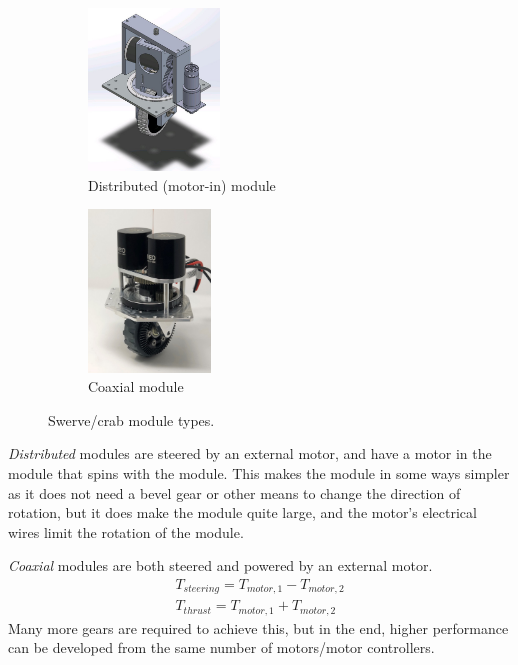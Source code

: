 \begin{figure}[H]

\begin{subfigure}[b]{.32\linewidth}
	\includegraphics[height=1.7in]{imgs/drivetrain_swerve_dist.jpeg}
	\caption{Distributed (motor-in) module}
\end{subfigure}\begin{subfigure}[b]{.32\linewidth}
	\includegraphics[height=1.7in]{imgs/drivetrain_swerve_coax.jpeg}
	\caption{Coaxial module}
\end{subfigure}
\caption{Swerve/crab module types.}
\end{figure}

\begin{asparaenum}[a)]
	\item \textit{Distributed} modules are steered by an external motor, and have a motor in the module that spins with the module. This makes the module in some ways simpler as it does not need a bevel gear or other means to change the direction of rotation, but it does make the module quite large, and the motor's electrical wires limit the rotation of the module.
	\item \textit{Coaxial} modules are both steered and powered by an external motor.
	\begin{align}
		T_{steering} = T_{motor, 1} - T_{motor, 2}\\
		T_{thrust}   = T_{motor, 1} + T_{motor, 2}
	\end{align}
	Many more gears are required to achieve this, but in the end, higher performance can be developed from the same number of motors/motor controllers.
\end{asparaenum}

